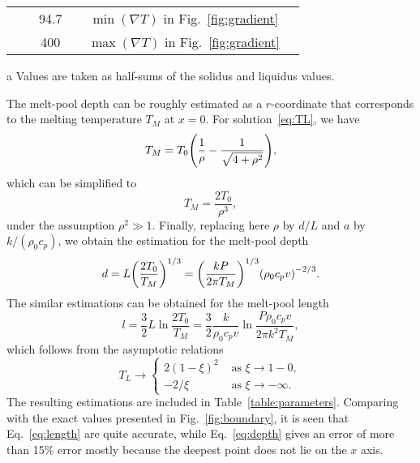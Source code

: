 \documentclass{article}
\begin{document}
\begin{table}
\begin{threeparttable}[b]
\begin{tabular}{lccccc}
        & & \num{94.7} & & $\min(\nabla T)$ in Fig.~\ref{fig:gradient} \\
        & & \num{400} & & $\max(\nabla T)$ in Fig.~\ref{fig:gradient} \\[2pt]
        \hline
    \end{tabular}
    \begin{tablenotes}
        \item[a]\label{a} Values are taken as half-sums of the solidus and liquidus values.
    \end{tablenotes}
    \end{threeparttable}
\end{table}

The melt-pool depth can be roughly estimated as a $r$-coordinate
that corresponds to the melting temperature $T_M$ at $x=0$.
For solution~\eqref{eq:TL}, we have
\begin{equation}\label{eq:TL_r}
    T_M = T_0\qty( \frac1{\rho} - \frac1{\sqrt{4 +\rho^2}} ),
\end{equation}
which can be simplified to
\begin{equation}\label{eq:TL_r2}
    T_M = \frac{2T_0}{\rho^3},
\end{equation}
under the assumption $\rho^2 \gg 1$.
Finally, replacing here $\rho$ by $d/L$ and $a$ by $k/(\rho_0 c_p)$, we obtain the estimation for the melt-pool depth
\begin{equation}\label{eq:depth}
    d = L\qty(\frac{2T_0}{T_M})^{1/3} = \qty(\frac{kP}{2\pi T_M})^{1/3}\qty(\rho_0 c_p v)^{-2/3}.
\end{equation}
The similar estimations can be obtained for the melt-pool length
\begin{equation}\label{eq:length}
    l = \frac32L\ln\frac{2T_0}{T_M} = \frac32\frac{k}{\rho_0 c_p v}\ln\frac{P\rho_0 c_p v}{2\pi k^2 T_M},
\end{equation}
which follows from the asymptotic relations
\begin{equation}\label{eq:TL_x}
    T_L \to \begin{cases}
        2(1-\xi)^2 &\text{ as } \xi\to1-0, \\
        -2/\xi &\text{ as } \xi\to-\infty.
    \end{cases}
\end{equation}
The resulting estimations are included in Table~\ref{table:parameters}.
Comparing with the exact values presented in Fig.~\ref{fig:boundary},
it is seen that Eq.~\eqref{eq:length} are quite accurate,
while Eq.~\eqref{eq:depth} gives an error of more than 15\% error mostly because the deepest point does not lie on the $x$ axis.
\end{document}
